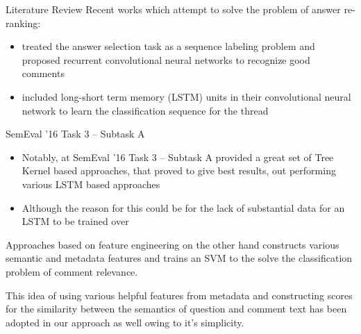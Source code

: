 \documentclass[10pt]{beamer}
\begin{document}
\begin{frame}{Literature Review}
	Recent works which attempt to solve the problem of answer re-ranking:
	\begin{itemize}
	\item \cite{lin2015icrc} treated the answer selection task as a sequence labeling problem and proposed recurrent convolutional neural networks to recognize good comments
	\item \cite{zhou2015answer} included long-short term memory (LSTM) units in their convolutional neural network to learn the classification sequence for the thread
	\end{itemize}
\end{frame}

\begin{frame}{SemEval '16 Task 3 -- Subtask A}
\begin{itemize}
\item Notably, at SemEval '16 Task 3 -- Subtask A provided a great set of Tree Kernel based approaches, that proved to give best results, out performing various LSTM based approaches \item Although the reason for this could be for the lack of substantial data for an LSTM to be trained over
\end{itemize}
\end{frame}


\begin{frame}{Approaches based on feature engineering}
\justify
\cite{mihaylov2016semanticz} on the other hand constructs various semantic and metadata features and trains an SVM to the solve the classification problem of comment relevance.

This idea of using various helpful features from metadata and constructing scores for the similarity between the semantics of question and comment text has been adopted in our approach as well owing to it's simplicity.
\end{frame}
\end{document}
